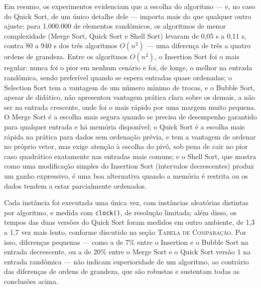 \qquad Em resumo, os experimentos evidenciam que a escolha do algoritmo
--- e, no caso do Quick Sort, de um único detalhe dele --- importa
mais do que qualquer outro ajuste: para 1.000.000 de elementos
randômicos, os algoritmos de menor complexidade (Merge Sort, Quick
Sort e Shell Sort) levaram de 0,05 s a 0,11 s, contra 80 a 940 s dos
três algoritmos $O(n^2)$ --- uma diferença de três a quatro ordens de
grandeza. Entre os algoritmos $O(n^2)$, o Insertion Sort foi o mais
regular: nunca foi o pior em nenhum cenário e foi, de longe, o melhor
na entrada randômica, sendo preferível quando se espera entradas quase
ordenadas; o Selection Sort tem a vantagem de um número mínimo de
trocas, e o Bubble Sort, apesar de didático, não apresentou vantagem
prática clara sobre os demais, a não ser na entrada crescente, onde
foi o mais rápido por uma margem muito pequena. O Merge Sort é a
escolha mais segura quando se precisa de desempenho garantido para
qualquer entrada e há memória disponível; o Quick Sort é a escolha
mais rápida na prática para dados sem ordenação prévia, e tem a
vantagem de ordenar no próprio vetor, mas exige atenção à escolha do
pivô, sob pena de cair no pior caso quadrático exatamente nas entradas
mais comuns; e o Shell Sort, que mostra como uma modificação simples
do Insertion Sort (intervalos decrescentes) produz um ganho
expressivo, é uma boa alternativa quando a memória é restrita ou os
dados tendem a estar parcialmente ordenados.

\qquad Cada instância foi executada uma única vez, com instâncias
aleatórias distintas por algoritmo, e medida com \texttt{clock()}, de
resolução limitada; além disso, os tempos das duas versões do Quick
Sort foram medidos em outro ambiente, de 1,3 a 1,7 vez mais lento,
conforme discutido na seção \textsc{Tabela de Comparação}. Por isso,
diferenças pequenas --- como a de 7\% entre o Insertion e o Bubble
Sort na entrada decrescente, ou a de 20\% entre o Merge Sort e o Quick
Sort versão 1 na entrada randômica --- não indicam superioridade de um
algoritmo, ao contrário das diferenças de ordens de grandeza, que são
robustas e sustentam todas as conclusões acima.
